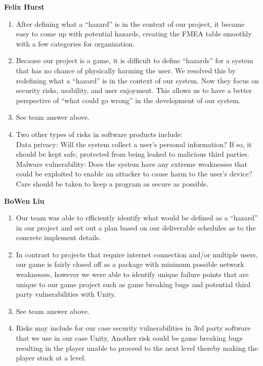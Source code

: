 \documentclass{article}
\begin{document}
\textbf{Felix Hurst}
\begin{enumerate}
\item{After defining what a “hazard” is in the context of our project, it became easy to come up with potential hazards, creating the FMEA table smoothly with a few categories for organization.}
\item{Because our project is a game, it is difficult to define “hazards” for a system that has no chance of physically harming the user. We resolved this by redefining what a “hazard” is in the context of our system. Now they focus on security risks, usability, and user enjoyment. This allows us to have a better perspective of “what could go wrong” in the development of our system.}
\item{See team answer above.}
\item{Two other types of risks in software products include:\\
Data privacy: Will the system collect a user’s personal information? If so, it should be kept safe, protected from being leaked to malicious third parties.\\
Malware vulnerability: Does the system have any extreme weaknesses that could be exploited to enable an attacker to cause harm to the user’s device? Care should be taken to keep a program as secure as possible.}
\end{enumerate}

\textbf{BoWen Liu}
\begin{enumerate}
\item{Our team was able to efficiently identify what would be defined as a “hazard” in our project and set out a plan based on our deliverable schedules as to the concrete implement details.}
\item{In contrast to projects that require internet connection and/or multiple users, our game is fairly closed off as a package with minimum possible network weaknesses, however we were able to identify unique failure points that are unique to our game project such as game breaking bugs and potential third party vulnerabilities with Unity.}
\item{See team answer above.}
\item{Risks may include for our case security vulnerabilities in 3rd party software that we use in our case Unity, Another risk could be game breaking bugs resulting in the player unable to proceed to the next level thereby making the player stuck at a level.}
\end{enumerate}
\end{document}
